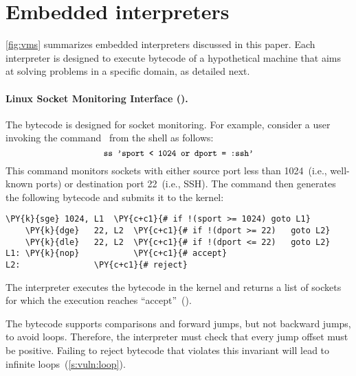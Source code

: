 \section{Embedded interpreters}
\label{s:vm}



\autoref{fig:vms} summarizes embedded interpreters discussed in this paper.
Each interpreter is designed to execute bytecode of a hypothetical machine
that aims at solving problems in a specific domain, as detailed next.

\paragraph{Linux Socket Monitoring Interface (\inetdiag).}
%
The \inetdiag bytecode is designed for socket monitoring.
For example, consider a user invoking the  command~\cite{inetdiag:ss}
from the shell as follows:
\begin{equation*}
\cc{ss 'sport < 1024 or dport = :ssh'}
\end{equation*}
This command monitors sockets with either
source port less than 1024~(i.e., well-known ports)
or destination port 22~(i.e., SSH).
The  command then
generates the following bytecode and submits it to the kernel:
\begin{Verbatim}[commandchars=\\\{\},codes={\catcode`\$=3\catcode`\^=7\catcode`\_=8}]
    \PY{k}{sge} 1024, L1  \PY{c+c1}{# if !(sport >= 1024) goto L1}
    \PY{k}{dge}   22, L2  \PY{c+c1}{# if !(dport >= 22)   goto L2}
    \PY{k}{dle}   22, L2  \PY{c+c1}{# if !(dport <= 22)   goto L2}
L1: \PY{k}{nop}           \PY{c+c1}{# accept}
L2:               \PY{c+c1}{# reject}
\end{Verbatim}
The \inetdiag interpreter executes the bytecode in the kernel
and returns a list of sockets for which the execution
reaches ``accept''~().

The \inetdiag bytecode supports comparisons and forward jumps, but not backward
jumps, to avoid loops.  Therefore, the interpreter must check that every jump
offset must be positive.  Failing to reject bytecode that violates this
invariant will lead to infinite loops~(\autoref{s:vuln:loop}).

